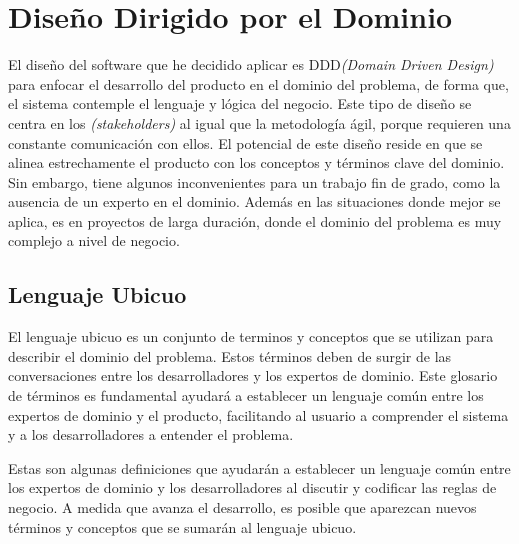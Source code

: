 \UseRawInputEncoding
\chapter{Diseño Dirigido por el Dominio}

El diseño del software que he decidido aplicar es DDD\textit{(Domain Driven Design)} para enfocar el
desarrollo del producto en el dominio del problema, de forma que, el sistema contemple el lenguaje y lógica del negocio.
Este tipo de diseño se centra en los \textit{(stakeholders)} al igual que la metodología ágil, porque requieren una constante comunicación con ellos.
El potencial de este diseño reside en que se alinea estrechamente el producto con los conceptos y términos clave del dominio.
Sin embargo, tiene algunos inconvenientes para un trabajo fin de grado, como la ausencia de un experto en el dominio.
Además en las situaciones donde mejor se aplica, es en proyectos de larga duración, donde el dominio del problema es muy complejo a nivel de negocio.

\section{Lenguaje Ubicuo}
El lenguaje ubicuo es un conjunto de terminos y conceptos que se utilizan para describir el dominio del problema.
Estos términos deben de surgir de las conversaciones entre los desarrolladores y los expertos de dominio.
Este glosario de términos es fundamental ayudará a establecer un lenguaje común entre los expertos de dominio y el producto,
facilitando al usuario a comprender el sistema y a los desarrolladores a entender el problema.

Estas son algunas definiciones que ayudarán a establecer un lenguaje común entre los expertos de dominio y los
desarrolladores al discutir y codificar las reglas de negocio. A medida que avanza el desarrollo, es posible que
aparezcan nuevos términos y conceptos que se sumarán al lenguaje ubicuo.

